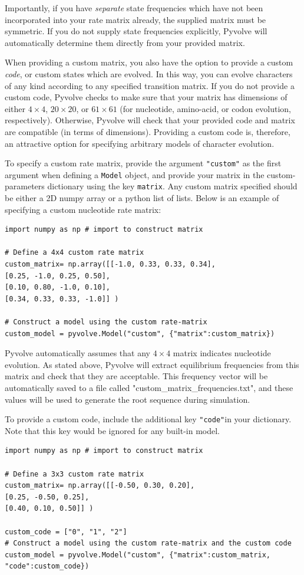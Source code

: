 \documentclass{article}
\newcommand{\code}[1]{\texttt{\small{#1}}}
\begin{document}
Importantly, if you have \emph{separate} state frequencies which have not been incorporated into your rate matrix already, the supplied matrix must be symmetric. If you do not supply state frequencies explicitly, Pyvolve will automatically determine them directly from your provided matrix.

When providing a custom matrix, you also have the option to provide a custom \emph{code}, or custom states which are evolved. In this way, you can evolve characters of any kind according to any specified transition matrix. If you do not provide a custom code, Pyvolve checks to make sure that your matrix has dimensions of either $4\times4$, $20\times20$, or $61\times61$ (for nucleotide, amino-acid, or codon evolution, respectively). Otherwise, Pyvolve will check that your provided code and matrix are compatible (in terms of dimensions). Providing a custom code is, therefore, an attractive option for specifying arbitrary models of character evolution.

To specify a custom rate matrix, provide the argument \code{"custom"} as the first argument when defining a \code{Model} object, and provide your matrix in the custom-parameters dictionary using the key \code{matrix}. Any custom matrix specified should be either a 2D numpy array or a python list of lists. Below is an example of specifying a custom nucleotide rate matrix:
\begin{lstlisting}
import numpy as np # import to construct matrix

# Define a 4x4 custom rate matrix
custom_matrix= np.array([[-1.0, 0.33, 0.33, 0.34],
[0.25, -1.0, 0.25, 0.50],
[0.10, 0.80, -1.0, 0.10],
[0.34, 0.33, 0.33, -1.0]] )

# Construct a model using the custom rate-matrix
custom_model = pyvolve.Model("custom", {"matrix":custom_matrix})
\end{lstlisting}
Pyvolve automatically assumes that any $4\times4$ matrix indicates nucleotide evolution. As stated above, Pyvolve will extract equilibrium frequencies from this matrix and check that they are acceptable. This frequency vector will be automatically saved to a file called "custom\_matrix\_frequencies.txt", and these values will be used to generate the root sequence during simulation.

To provide a custom code, include the additional key \code{"code"}in your dictionary. Note that this key would be ignored for any built-in model.
\begin{lstlisting}
import numpy as np # import to construct matrix

# Define a 3x3 custom rate matrix
custom_matrix= np.array([[-0.50, 0.30, 0.20],
[0.25, -0.50, 0.25],
[0.40, 0.10, 0.50]] )

custom_code = ["0", "1", "2"]
# Construct a model using the custom rate-matrix and the custom code
custom_model = pyvolve.Model("custom", {"matrix":custom_matrix, "code":custom_code})
\end{lstlisting}
\end{document}
